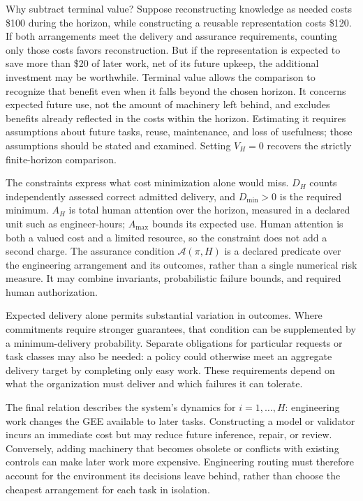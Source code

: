 Why subtract terminal value? Suppose reconstructing knowledge as needed costs \$100 during the horizon, while constructing a reusable representation costs \$120. If both arrangements meet the delivery and assurance requirements, counting only those costs favors reconstruction. But if the representation is expected to save more than \$20 of later work, net of its future upkeep, the additional investment may be worthwhile. Terminal value allows the comparison to recognize that benefit even when it falls beyond the chosen horizon. It concerns expected future use, not the amount of machinery left behind, and excludes benefits already reflected in the costs within the horizon. Estimating it requires assumptions about future tasks, reuse, maintenance, and loss of usefulness; those assumptions should be stated and examined. Setting \(V_H=0\) recovers the strictly finite-horizon comparison.

The constraints express what cost minimization alone would miss. \(D_H\) counts independently assessed correct admitted delivery, and \(D_{\min}>0\) is the required minimum. \(A_H\) is total human attention over the horizon, measured in a declared unit such as engineer-hours; \(A_{\max}\) bounds its expected use. Human attention is both a valued cost and a limited resource, so the constraint does not add a second charge. The assurance condition \(\mathcal{A}(\pi,H)\) is a declared predicate over the engineering arrangement and its outcomes, rather than a single numerical risk measure. It may combine invariants, probabilistic failure bounds, and required human authorization.

Expected delivery alone permits substantial variation in outcomes. Where commitments require stronger guarantees, that condition can be supplemented by a minimum-delivery probability. Separate obligations for particular requests or task classes may also be needed: a policy could otherwise meet an aggregate delivery target by completing only easy work. These requirements depend on what the organization must deliver and which failures it can tolerate.

The final relation describes the system's dynamics for \(i=1,\ldots,H\): engineering work changes the GEE available to later tasks. Constructing a model or validator incurs an immediate cost but may reduce future inference, repair, or review. Conversely, adding machinery that becomes obsolete or conflicts with existing controls can make later work more expensive. Engineering routing must therefore account for the environment its decisions leave behind, rather than choose the cheapest arrangement for each task in isolation.

